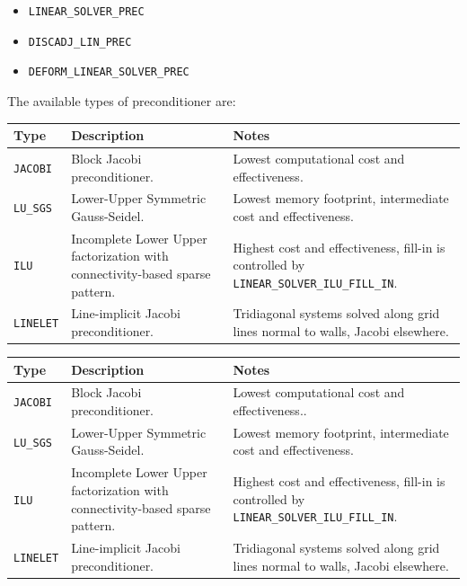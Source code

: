 \documentclass[12pt, a4paper, twoside]{article}
\begin{document}
\begin{itemize}
    \item \verb|LINEAR_SOLVER_PREC|
    \item \verb|DISCADJ_LIN_PREC|
    \item \verb|DEFORM_LINEAR_SOLVER_PREC|
\end{itemize}

The available types of preconditioner are:

\vspace{3mm}

\begin{center}

\begin{adjustbox}{width=\textwidth}
\begin{tabular}{  m{6em}  m{17em}  m{15em}  } 

  \textbf{Type} & \textbf{Description} & \textbf{Notes} \\ 
  \hline
    \texttt{JACOBI} & Block Jacobi preconditioner. & Lowest computational cost and effectiveness.\\ 
  \hline
  \texttt{LU\_SGS} & Lower-Upper Symmetric Gauss-Seidel. & Lowest memory footprint, intermediate cost and effectiveness. \\ 
  \hline
    \texttt{ILU} & Incomplete Lower Upper factorization with connectivity-based sparse pattern. & Highest cost and effectiveness, fill-in is controlled by \texttt{LINEAR\_SOLVER\_ILU\_FILL\_IN}. \\ 
  \hline
  \texttt{LINELET} & Line-implicit Jacobi preconditioner. & Tridiagonal systems solved along grid lines normal to walls, Jacobi elsewhere. \\ 
  \hline
  \hline
  \end{tabular}
\end{adjustbox}

\end{center}

\iffalse

\begin{center}
\begin{tabular}{  m{6em}  m{17em}  m{15em}  } 
  \hline\hline
  \textbf{Type} & \textbf{Description} & \textbf{Notes} \\ 
  \hline
    \texttt{JACOBI} & Block Jacobi preconditioner. & Lowest computational cost and effectiveness..\\ 
  \hline
  \verb|LU_SGS|	& Lower-Upper Symmetric Gauss-Seidel. & Lowest memory footprint, intermediate cost and effectiveness. \\ 
  \hline
    \texttt{ILU} & Incomplete Lower Upper factorization with connectivity-based sparse pattern. & Highest cost and effectiveness, fill-in is controlled by \verb|LINEAR_SOLVER_ILU_FILL_IN|. \\ 
  \hline
  \texttt{LINELET} & Line-implicit Jacobi preconditioner. & Tridiagonal systems solved along grid lines normal to walls, Jacobi elsewhere. \\ 
  \hline
  \hline
\end{tabular}
\end{center}
\end{document}
